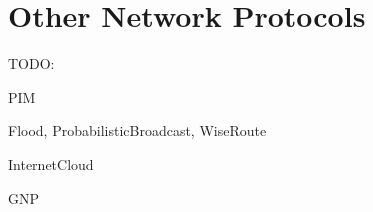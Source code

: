 \ifdraft

\chapter{Other Network Protocols}
\label{cha:other-network-protocols}

TODO: 

PIM

Flood, ProbabilisticBroadcast, WiseRoute

InternetCloud

GNP

\fi


